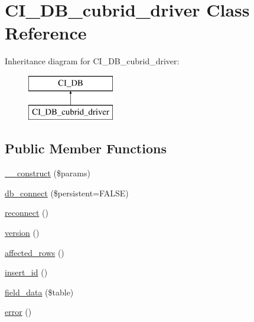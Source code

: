 \hypertarget{class_c_i___d_b__cubrid__driver}{}\section{C\+I\+\_\+\+D\+B\+\_\+cubrid\+\_\+driver Class Reference}
\label{class_c_i___d_b__cubrid__driver}
Inheritance diagram for C\+I\+\_\+\+D\+B\+\_\+cubrid\+\_\+driver\+:\begin{figure}[H]
\begin{center}
\leavevmode
\includegraphics[height=2.000000cm]{class_c_i___d_b__cubrid__driver}
\end{center}
\end{figure}
\subsection*{Public Member Functions}
\begin{DoxyCompactItemize}
\item 
\mbox{\hyperlink{class_c_i___d_b__cubrid__driver_ad83d25f800ca3549052940b456824840}{\+\_\+\+\_\+construct}} (\$params)
\item 
\mbox{\hyperlink{class_c_i___d_b__cubrid__driver_a3faae0971a25e57309943ab7ffb6b4bd}{db\+\_\+connect}} (\$persistent=F\+A\+L\+SE)
\item 
\mbox{\hyperlink{class_c_i___d_b__cubrid__driver_a6de75d925af9ab22ef31ef7ea662f501}{reconnect}} ()
\item 
\mbox{\hyperlink{class_c_i___d_b__cubrid__driver_a884a0f0526d265ee6cad5051dfaf8e8f}{version}} ()
\item 
\mbox{\hyperlink{class_c_i___d_b__cubrid__driver_ae06c13adb20f481923d8202171385148}{affected\+\_\+rows}} ()
\item 
\mbox{\hyperlink{class_c_i___d_b__cubrid__driver_adea3af9abf1db1b4d802da2160f8fc73}{insert\+\_\+id}} ()
\item 
\mbox{\hyperlink{class_c_i___d_b__cubrid__driver_a8006c7fbb75eceb9d5ec9246afb90f7f}{field\+\_\+data}} (\$table)
\item 
\mbox{\hyperlink{class_c_i___d_b__cubrid__driver_a07b51fd792e4f2d2df26f6cbde9520da}{error}} ()
\end{DoxyCompactItemize}
